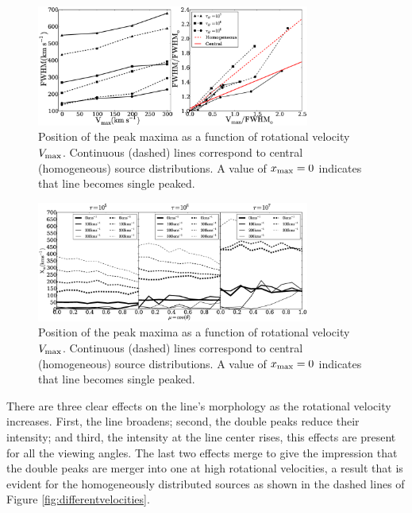 \documentclass{emulateapj}
\begin{document}
\begin{figure}
\begin{center}
  \includegraphics[width=0.8\textwidth]{f2.eps}
\end{center}
\caption{Position of the peak maxima as a function of rotational
  velocity $V_{\rm max}$. Continuous (dashed) lines correspond to
  central (homogeneous) source distributions. A value of $x_{\rm
    max}=0$ indicates that line becomes single
  peaked. \label{fig:widthsvsvelocity}}  
\end{figure}


\begin{figure}
\begin{center}
  \includegraphics[width=0.8\textwidth]{maxima.eps}
\end{center}
\caption{Position of the peak maxima as a function of rotational
  velocity $V_{\rm max}$. Continuous (dashed) lines correspond to
  central (homogeneous) source distributions. A value of $x_{\rm
    max}=0$ indicates that line becomes single
  peaked. \label{fig:maximumsvsvelocity}}  
\end{figure}


There are three clear effects on the line's morphology as the
rotational velocity increases. First, the line
broadens; second, the double peaks reduce their intensity; and third,
the intensity at the line center rises, this effects are present for 
all the viewing angles. The last two effects merge to give the
impression that the double peaks are merger into one at high rotational
velocities, a result that is evident for the homogeneously distributed
sources as shown in the dashed lines of Figure \ref{fig:differentvelocities}.
\end{document}
